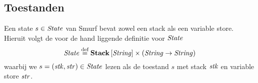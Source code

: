 \subsection{Toestanden}
\label{sec:def:state}

Een state $s\in\mathit{State}$ van Smurf bevat zowel een stack als een variable store.
Hieruit volgt de voor de hand liggende definitie voor $\mathit{State}$
$$\mathit{State} \stackrel{\text{def}}{=} \mathbf{Stack}\left[\mathit{\mathit{String}}\right] \times (\mathit{String} \to \mathit{String})$$
waarbij we $s=(\mathit{stk},\mathit{str})\in\mathit{State}$ lezen als de toestand $s$ met stack $\mathit{stk}$
en variable store $\mathit{str}$.

